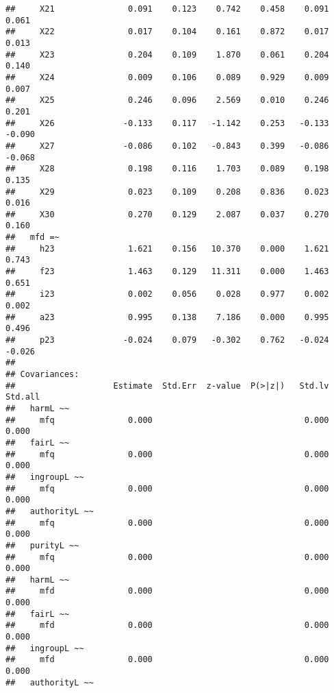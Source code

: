 \documentclass[english,man]{apa6}
\newcounter{author}
\theoremstyle{definition}
\theoremstyle{definition}
\theoremstyle{definition}
\theoremstyle{remark}
\begin{document}
\begin{verbatim}
##     X21               0.091    0.123    0.742    0.458    0.091    0.061
##     X22               0.017    0.104    0.161    0.872    0.017    0.013
##     X23               0.204    0.109    1.870    0.061    0.204    0.140
##     X24               0.009    0.106    0.089    0.929    0.009    0.007
##     X25               0.246    0.096    2.569    0.010    0.246    0.201
##     X26              -0.133    0.117   -1.142    0.253   -0.133   -0.090
##     X27              -0.086    0.102   -0.843    0.399   -0.086   -0.068
##     X28               0.198    0.116    1.703    0.089    0.198    0.135
##     X29               0.023    0.109    0.208    0.836    0.023    0.016
##     X30               0.270    0.129    2.087    0.037    0.270    0.160
##   mfd =~                                                                
##     h23               1.621    0.156   10.370    0.000    1.621    0.743
##     f23               1.463    0.129   11.311    0.000    1.463    0.651
##     i23               0.002    0.056    0.028    0.977    0.002    0.002
##     a23               0.995    0.138    7.186    0.000    0.995    0.496
##     p23              -0.024    0.079   -0.302    0.762   -0.024   -0.026
## 
## Covariances:
##                    Estimate  Std.Err  z-value  P(>|z|)   Std.lv  Std.all
##   harmL ~~                                                              
##     mfq               0.000                               0.000    0.000
##   fairL ~~                                                              
##     mfq               0.000                               0.000    0.000
##   ingroupL ~~                                                           
##     mfq               0.000                               0.000    0.000
##   authorityL ~~                                                         
##     mfq               0.000                               0.000    0.000
##   purityL ~~                                                            
##     mfq               0.000                               0.000    0.000
##   harmL ~~                                                              
##     mfd               0.000                               0.000    0.000
##   fairL ~~                                                              
##     mfd               0.000                               0.000    0.000
##   ingroupL ~~                                                           
##     mfd               0.000                               0.000    0.000
##   authorityL ~~                                                         

\end{verbatim}
\end{document}
